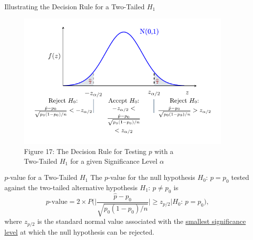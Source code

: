 \documentclass[pdf]{beamer}
\theoremstyle{remark}
\theoremstyle{definition}
\begin{document}
\begin{frame}[t]{Illustrating the Decision Rule for a Two-Tailed $H_1$ }
\begin{figure}[htbp]
    \centering
    \captionsetup{justification=centering}
    \includegraphics[clip, trim=0.5cm 0.5cm 0.0cm 0cm, width=0.95\textwidth]{Hypothesis_Testing_Module_9_pZ3.pdf}  
    \caption{Figure {\color{franklinblue} 17}: The Decision Rule for Testing $p$ with a \\ Two-Tailed $H_1$ for a given Significance Level $\alpha$}
    \label{fig:gauss9}
\end{figure}
\end{frame}

\begin{frame}[t]{$p$-value for a Two-Tailed $H_1$}
The $p$-value for the null hypothesis $H_0\text{: }  p = p_0$ tested against the two-tailed alternative hypothesis $H_1\text{: }  p \neq p_0$ is
\begin{equation}
p\text{-value} = 2 \times P\bigg( \bigg| \frac{\hat{p} - p_0}{\sqrt{p_0(1-p_0)/ n}} \bigg| \geq z_{p/2} | H_0\text{: }  p = p_0 \bigg),
\end{equation}
where $z_{p/2}$ is the standard normal value associated with the \underline{smallest significance level} at which the null hypothesis can be rejected.
\end{frame}
\end{document}
